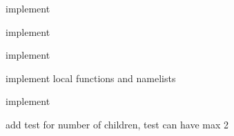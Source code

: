 \begin{DoxyRefList}
implement 

implement  
\item[\label{todo__todo000009}%
\hypertarget{todo__todo000009}{}%
Member \hyperlink{classNode_a8dad370be1595f49e0a7c2406a91e867a82f82cd405ee2ded93d8f9133e2f5f34}{Node\+:\+:Stat} ]implement  
\item[\label{todo__todo000005}%
\hypertarget{todo__todo000005}{}%
Member \hyperlink{classNode_a8dad370be1595f49e0a7c2406a91e867}{Node\+:\+:Type} ]implement local functions and namelists  
\item[\label{todo__todo000006}%
\hypertarget{todo__todo000006}{}%
Member \hyperlink{classNode_a8dad370be1595f49e0a7c2406a91e867a8fb6b35a2762acd63c8d42fc8575889e}{Node\+:\+:Variable\+List} ]implement  
\item[\label{todo__todo000016}%
\hypertarget{todo__todo000016}{}%
Class \hyperlink{classTest}{Test} ]add test for number of children, test can have max 2 
\end{DoxyRefList}
